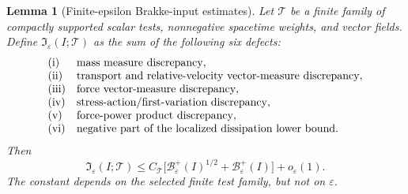 \documentclass[11pt]{article}
\newtheorem{lemma}[theorem]{Lemma}
\theoremstyle{definition}
\newcommand{\eps}{\varepsilon}
\newcommand{\Basin}{\mathcal B}
\begin{document}
\begin{lemma}[Finite-epsilon Brakke-input estimates]
\label{lem:short-input-ledger}
Let \(\mathscr T\) be a finite family of compactly supported scalar tests,
nonnegative spacetime weights, and vector fields.  Define
\(\mathfrak I_\eps(I;\mathscr T)\) as the sum of the following six defects:
\[
\begin{array}{ll}
{\rm (i)} & \hbox{mass measure discrepancy},\\
{\rm (ii)} & \hbox{transport and relative-velocity vector-measure discrepancy},\\
{\rm (iii)} & \hbox{force vector-measure discrepancy},\\
{\rm (iv)} & \hbox{stress-action/first-variation discrepancy},\\
{\rm (v)} & \hbox{force-power product discrepancy},\\
{\rm (vi)} & \hbox{negative part of the localized dissipation lower bound}.
\end{array}
\]
Then
\[
        \mathfrak I_\eps(I;\mathscr T)
        \le
        C_{\mathscr T}
        \bigl[
        \Basin_\eps^+(I)^{1/2}
        +
        \Basin_\eps^+(I)
        \bigr]
        +
        o_\eps(1).
\]
The constant depends on the selected finite test family, but not on
\(\eps\).
\end{lemma}
\end{document}
